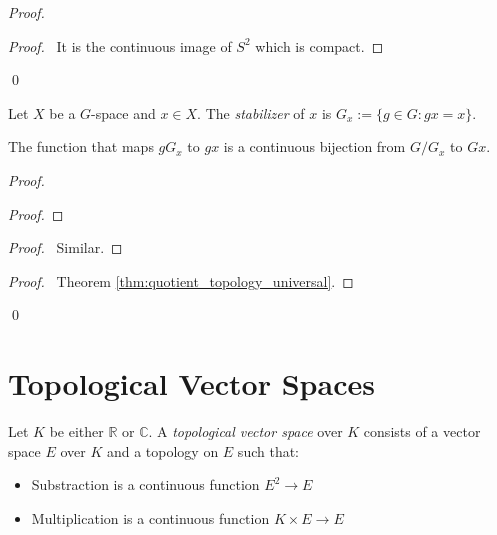 \begin{proof}
\pf
{}
\begin{proof}
	\pf\ It is the continuous image of $S^2$ which is compact.
\end{proof}
\qed
\end{proof}

\begin{df}[Stabilizer]
Let $X$ be a $G$-space and $x \in X$. The \emph{stabilizer} of $x$ is $G_x := \{ g \in G : gx = x \}$.
\end{df}

\begin{prop}
The function that maps $gG_x$ to $gx$ is a continuous bijection from $G / G_x$ to $Gx$.
\end{prop}

\begin{proof}
\pf
{}
\begin{proof}
\end{proof}
\begin{proof}
	\pf\ Similar.
\end{proof}
\begin{proof}
	\pf\ Theorem \ref{thm:quotient_topology_universal}.
\end{proof}
\qed
\end{proof}

\chapter{Topological Vector Spaces}

\begin{df}
Let $K$ be either $\mathbb{R}$ or $\mathbb{C}$. A \emph{topological vector space} over $K$ consists of a 	vector space $E$ over $K$ and a topology on $E$ such that:
\begin{itemize}
\item Substraction is a continuous function $E^2 \rightarrow E$
\item Multiplication is a continuous function $K \times E \rightarrow E$
\end{itemize}
\end{df}

